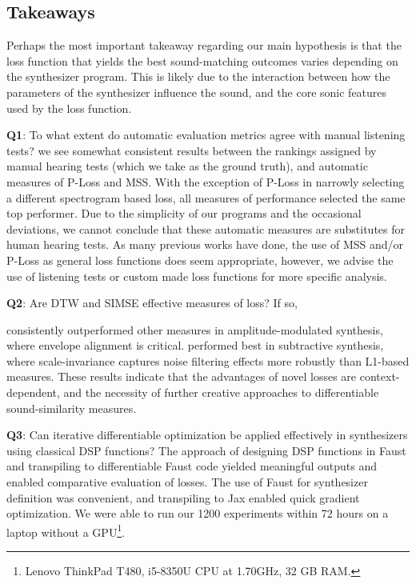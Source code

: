 
\subsection{Takeaways}
Perhaps the most important takeaway regarding our main hypothesis is that the loss function that yields the best sound-matching outcomes varies depending on the synthesizer program. This is likely due to the interaction between how the parameters of the synthesizer influence the sound, and the core sonic features used by the loss function.

\textbf{Q1}: To what extent do automatic evaluation metrics agree with manual listening tests? we see somewhat consistent results between the rankings assigned by manual hearing tests (which we take as the ground truth), and automatic measures of P-Loss and MSS. With the exception of P-Loss in \BPNoise{} narrowly selecting a different spectrogram based loss, all measures of performance selected the same top performer. Due to the simplicity of our programs and the occasional deviations, we cannot conclude that these automatic measures are substitutes for human hearing tests. As many previous works have done, the use of MSS and/or P-Loss as general loss functions does seem appropriate, however, we advise the use of listening tests or custom made loss functions for more specific analysis. 

\textbf{Q2}: Are DTW and SIMSE effective measures of loss? If so, 

 \DTWEnv{} consistently outperformed other measures in amplitude-modulated synthesis, where envelope alignment is critical. \SIMSESpec{} performed best in subtractive synthesis, where scale-invariance captures noise filtering effects more robustly than L1-based measures. These results indicate that the advantages of novel losses are context-dependent, and the necessity of further creative approaches to differentiable sound-similarity measures. 

\textbf{Q3}: Can iterative differentiable optimization be applied effectively in synthesizers using classical DSP functions?
The approach of designing DSP functions in Faust and transpiling to differentiable Faust code yielded meaningful outputs and enabled comparative evaluation of losses. The use of Faust for synthesizer definition was convenient, and transpiling to Jax enabled quick gradient optimization. We were able to run our 1200 experiments within 72 hours on a laptop without a GPU\footnote{Lenovo ThinkPad T480, i5-8350U CPU at 1.70GHz, 32 GB RAM.}.

